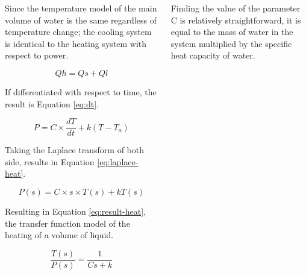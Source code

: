 \documentclass[final]{beamer}
\newlength{\onecolwid}
\newlength{\twocolwid}
\begin{document}
\begin{frame}[t]
\begin{columns}[t]
\begin{column}{\twocolwid}
\begin{columns}[t,totalwidth=\twocolwid] %

\begin{column}{\onecolwid} %
Since the temperature model of the main volume of water is the same regardless of  temperature change; the cooling system is identical to the heating system with respect to power.

\begin{equation}
Qh = Qs + Ql
\label{eq:heat-system}
\end{equation}

\noindent If differentiated with respect to time, the result is Equation \ref{eq:dt}.

\begin{equation}
P = C \times \frac{dT}{dt} + k(T - T_{a})
\label{eq:dt}
\end{equation}

Taking the Laplace transform of both side, results in Equation \ref{eq:laplace-heat}.

\begin{equation}
P(s) = C \times s \times T(s) + kT(s)
\label{eq:laplace-heat}
\end{equation}

\noindent Resulting in Equation \ref{eq:result-heat}, the transfer function model of the heating of a volume of liquid.

\begin{equation}
\frac{T(s)}{P(s)} = \frac{1}{Cs + k}
\label{eq:result-heat}
\end{equation}


\end{column} %

\begin{column}{\onecolwid} %
\noindent  Finding the value of the parameter C is relatively straightforward, it is equal to the mass of water in the system multiplied by the specific heat capacity of water.


\end{column}
\end{columns}
\end{column}
\end{columns}
\end{frame}
\end{document}
